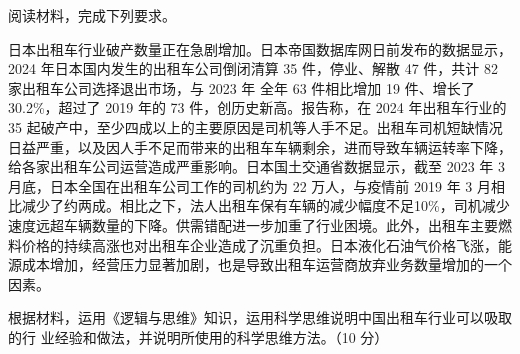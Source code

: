 \documentclass{exam-zh}
\newenvironment{kaiti-indented}{
  \parindent=2em
  \CJKfamily{zhkai}
  \setstretch{1.4}
}{
}
\begin{document}
\begin{question}
  阅读材料，完成下列要求。

  \begin{kaiti-indented}
    日本出租车行业破产数量正在急剧增加。日本帝国数据库网日前发布的数据显示，2024 年日本国内发生的出租车公司倒闭清算 35 件，停业、解散 47 件，共计 82 家出租车公司选择退出市场，与 2023 年 全年 63 件相比增加 19 件、增长了 30.2\%，超过了 2019 年的 73 件，创历史新高。报告称，在 2024 年出租车行业的 35 起破产中，至少四成以上的主要原因是司机等人手不足。出租车司机短缺情况日益严重，以及因人手不足而带来的出租车车辆剩余，进而导致车辆运转率下降，给各家出租车公司运营造成严重影响。日本国土交通省数据显示，截至 2023 年 3 月底，日本全国在出租车公司工作的司机约为 22 万人，与疫情前 2019 年 3 月相比减少了约两成。相比之下，法人出租车保有车辆的减少幅度不足10\%，司机减少速度远超车辆数量的下降。供需错配进一步加重了行业困境。此外，出租车主要燃料价格的持续高涨也对出租车企业造成了沉重负担。日本液化石油气价格飞涨，能源成本增加，经营压力显著加剧，也是导致出租车运营商放弃业务数量增加的一个因素。
  \end{kaiti-indented}

  根据材料，运用《逻辑与思维》知识，运用科学思维说明中国出租车行业可以吸取的行
  业经验和做法，并说明所使用的科学思维方法。（10 分）
\end{question}
\end{document}

